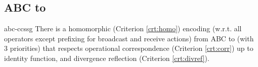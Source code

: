 \documentclass[adraft,hidelinks]{eptcs}
\begin{document}

\subsection{ABC to \CSG}
\label{sec:abc-ccssg}
\begin{proposition}{abc-ccssg}
  There is a homomorphic (Criterion \ref{crt:homo}) encoding (w.r.t. all operators except prefixing for broadcast and receive actions) from ABC to \CSG (with 3 priorities) that respects operational correspondence (Criterion \ref{crt:corr}) up to identity function, and divergence reflection (Criterion \ref{crt:divref}).
\end{proposition}
\end{document}
